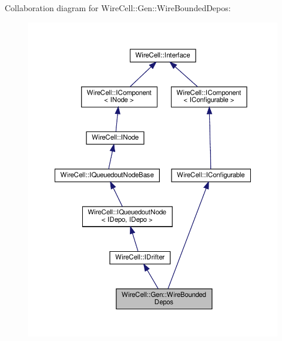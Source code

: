 Collaboration diagram for Wire\+Cell\+:\+:Gen\+:\+:Wire\+Bounded\+Depos\+:
\nopagebreak
\begin{figure}[H]
\begin{center}
\leavevmode
\includegraphics[width=350pt]{class_wire_cell_1_1_gen_1_1_wire_bounded_depos__coll__graph}
\end{center}
\end{figure}
